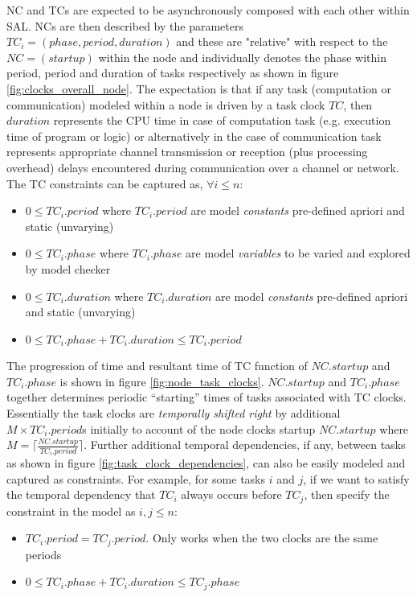 NC and TCs are expected to be asynchronously composed with each other within SAL. NCs are then described by the parameters $TC_i = (phase,period, duration)$ and these are "relative" with respect to the $NC=(startup)$ within the node and individually denotes the phase within period, period and duration of tasks respectively as shown in figure \ref{fig:clocks_overall_node}. The expectation is that if any task (computation or communication) modeled within a node is driven by a task clock $TC$, then $duration$ represents the CPU time in case of computation task (e.g. execution time of program or logic) or alternatively in the case of communication task represents appropriate channel transmission or reception (plus processing overhead) delays encountered during communication over a channel or network. The TC constraints can be captured as, $\forall i \leq n$:
\begin{itemize}
\item $0 \leq TC_i.period$ where $TC_i.period$ are model \emph{constants} pre-defined apriori and static (unvarying)
\item $0 \leq TC_i.phase$ where $TC_i.phase$ are  model \emph{variables} to be varied and explored by model checker
\item $0 \leq TC_i.duration$ where $TC_i.duration$ are model \emph{constants} pre-defined apriori and static (unvarying)
\item $0 \leq TC_i.phase + TC_i.duration \leq TC_i.period$
\end{itemize}

The progression of time and resultant time of TC function of $NC.startup$ and $TC_i.phase$ is shown in figure \ref{fig:node_task_clocks}. $NC.startup$  and $TC_i.phase$ together determines periodic “starting” times of tasks associated with TC clocks. Essentially the task clocks are \emph{temporally shifted right} by additional $M \times TC_i.period$s initially to account of the node clocks startup $NC.startup$ where $M=\lceil\frac{NC.startup}{TC_i.period}\rceil$. Further additional temporal dependencies, if any, between tasks as shown in figure \ref{fig:task_clock_dependencies}, can also be easily modeled and captured as constraints.  For example, for some tasks $i$ and $j$, if we want to satisfy the temporal dependency that $TC_i$ always occurs before $TC_j$, then specify the constraint in the model as $i,j \leq n$:
\begin{itemize}
\item $TC_i.period = TC_j.period$. Only works when the two clocks are the same periods
\item $0 \leq TC_i.phase + TC_i.duration \leq TC_j.phase$
\end{itemize}

